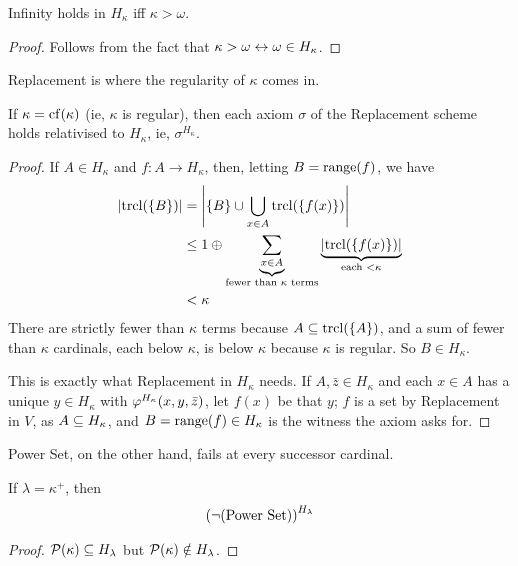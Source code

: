 \begin{boxlemma}
    Infinity holds in $H_{\kappa}$ iff $\kappa > \omega$.
\end{boxlemma}
\begin{proof}
    Follows from the fact that $\kappa > \omega \leftrightarrow \omega \in H_{\kappa}$.
\end{proof}

Replacement is where the regularity of $\kappa$ comes in.

\begin{boxlemma} \label{Ch3:Lemma:H_Kappa_Replacement}
    If $\kappa = \operatorname{cf}(\kappa)$ (ie, $\kappa$ is regular), then each axiom $\sigma$ of the Replacement scheme holds relativised to $H_{\kappa}$, ie, $\sigma^{H_{\kappa}}$.
\end{boxlemma}
\begin{proof}
    If $A \in H_{\kappa}$ and $f : A \to H_{\kappa}$, then, letting $B = \operatorname{range}\!\left( f \right)$, we have
    \begin{align*}
        \left\lvert \operatorname{trcl}\!\left( \left\{ B \right\} \right) \right\rvert
        &= \left\lvert \left\{ B \right\} \cup \bigcup_{x \in A} \operatorname{trcl}\!\left( \left\{ f(x) \right\} \right) \right\rvert \\
        &\leq 1 \oplus \underbrace{\sum_{x \in A}}_{\text{fewer than } \kappa \text{ terms}} \underbrace{\left\lvert \operatorname{trcl}\!\left( \left\{ f(x) \right\} \right) \right\rvert}_{\text{each } < \kappa} \\
        &< \kappa
    \end{align*}
    There are strictly fewer than $\kappa$ terms because $A \subseteq \operatorname{trcl}\!\left( \left\{ A \right\} \right)$, and a sum of fewer than $\kappa$ cardinals, each below $\kappa$, is below $\kappa$ because $\kappa$ is regular. So $B \in H_{\kappa}$.

    This is exactly what Replacement in $H_{\kappa}$ needs. If $A, \bar{z} \in H_{\kappa}$ and each $x \in A$ has a unique $y \in H_{\kappa}$ with $\varphi^{H_{\kappa}}\!\left( x, y, \bar{z} \right)$, let $f(x)$ be that $y$; $f$ is a set by Replacement in $V$, as $A \subseteq H_{\kappa}$, and $B = \operatorname{range}\!\left( f \right) \in H_{\kappa}$ is the witness the axiom asks for.
\end{proof}

Power Set, on the other hand, fails at every successor cardinal.

\begin{boxlemma}
    If $\lambda = \kappa^+$, then
    \begin{align*}
        \left( \neg \text{(Power Set)} \right)^{H_{\lambda}}
    \end{align*}
\end{boxlemma}
\begin{proof}
    $\mathcal{P}(\kappa) \subseteq H_{\lambda}$ but $\mathcal{P}(\kappa) \notin H_{\lambda}$.
\end{proof}

